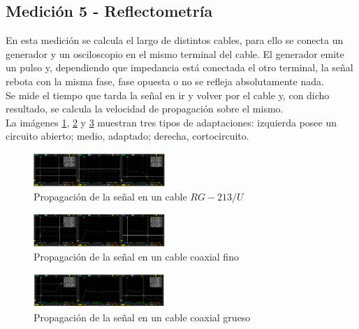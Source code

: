 \documentclass[a4paper,10pt]{article}
\begin{document}
	\subsection{Medición 5 - Reflectometría}
	\indent En esta medición se calcula el largo de distintos cables, para ello
	se conecta un generador y un osciloscopio en el mismo terminal del cable. El
	generador emite un pulso y, dependiendo que impedancia está conectada el 
	otro terminal, la señal rebota con la misma fase, fase opuesta o no se 
	refleja absolutamente nada. \\
	\indent Se mide el tiempo que tarda la señal en ir y volver por el cable y,
	con dicho resultado, se calcula la velocidad de propagación sobre el mismo.
	\\
	\indent La imágenes \ref{img010}, \ref{img011} y \ref{img012} muestran tres
	tipos de adaptaciones: izquierda posee un circuito abierto; medio, adaptado;
	derecha, cortocircuito. \\

		\begin{figure}[!htb]
			\centering
			\includegraphics[width=5cm]
			{Imagenes/CableF&G.png}
			\caption{Propagación de la señal en un cable $RG-213/U$}
			\label{img010}
		\end{figure}
		\begin{figure}[!htb]
			\centering
			\includegraphics[width=5cm]
			{Imagenes/CableCoaxialFino.png}
			\caption{Propagación de la señal en un cable coaxial fino}
			\label{img011}
		\end{figure}
		\begin{figure}[!htb]
			\centering
			\includegraphics[width=5cm]
			{Imagenes/CableCoaxialGrueso.png}
			\caption{Propagación de la señal en un cable coaxial grueso}
			\label{img012}
		\end{figure}
\end{document}
